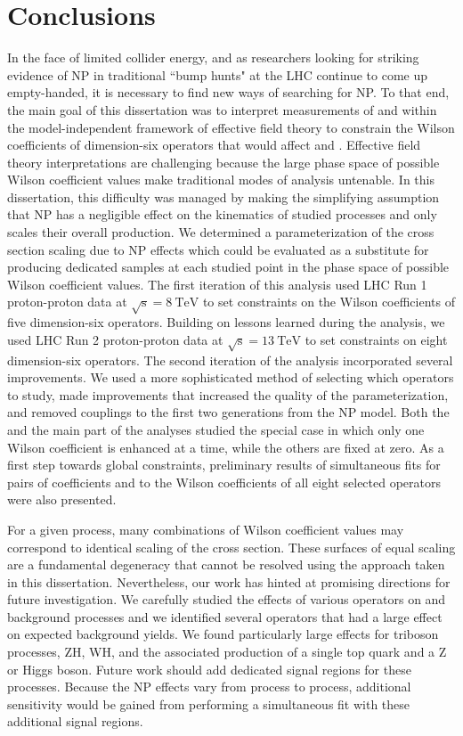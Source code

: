 \chapter{Conclusions}
In the face of limited collider energy, and as researchers looking for striking
evidence of NP in traditional ``bump hunts" at the LHC continue to come up
empty-handed, it is necessary to find new ways of searching for NP. To that end,
the main goal of this dissertation was to interpret measurements of \ttW and
\ttZ within the model-independent framework of effective field theory to
constrain the Wilson coefficients of dimension-six operators that would affect
\ttW and \ttZ. Effective field theory interpretations are challenging because
the large phase space of possible Wilson coefficient values make traditional
modes of analysis untenable. In this dissertation, this difficulty was managed
by making the simplifying assumption that NP has a negligible effect on the
kinematics of studied processes and only scales their overall production. We
determined a parameterization of the cross section scaling due to NP effects
which could be evaluated as a substitute for producing dedicated samples at each
studied point in the phase space of possible Wilson coefficient values. The
first iteration of this analysis used LHC Run 1 proton-proton data at
$\sqrt{\text{s}}=\SI{8}{\TeV}$ to set constraints on the Wilson coefficients of
five dimension-six operators. Building on lessons learned during the \eightTeV
analysis, we used LHC Run 2 proton-proton data at
$\sqrt{\text{s}}=\SI{13}{\TeV}$ to set constraints on eight dimension-six
operators. The second iteration of the analysis incorporated several
improvements. We used a more sophisticated method of selecting which operators
to study, made improvements that increased the quality of the parameterization,
and removed couplings to the first two generations from the NP model. Both the
\eightTeV and the main part of the \thirteenTeV analyses studied the special
case in which only one Wilson coefficient is enhanced at a time, while the
others are fixed at zero. As a first step towards global constraints,
preliminary results of simultaneous fits for pairs of coefficients and to the
Wilson coefficients of all eight selected operators were also presented.

For a given process, many combinations of Wilson coefficient values may
correspond to identical scaling of the cross section. These surfaces of equal
scaling are a fundamental degeneracy that cannot be resolved using the approach
taken in this dissertation. Nevertheless, our work has hinted at promising
directions for future investigation. We carefully studied the effects of various
operators on \ttW and \ttZ background processes and we identified several
operators that had a large effect on expected background yields. We found
particularly large effects for triboson processes, ZH, WH, and the associated
production of a single top quark and a Z or Higgs boson. Future work should add
dedicated signal regions for these processes. Because the NP effects vary from
process to process, additional sensitivity would be gained from performing a
simultaneous fit with these additional signal regions.

